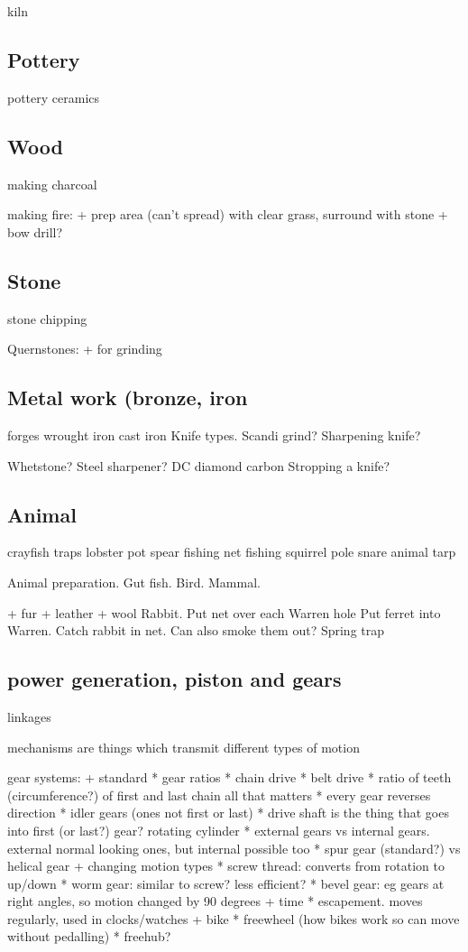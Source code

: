 kiln
\subsection{Pottery}
pottery
ceramics
\subsection{Wood}
making charcoal

making fire:
+ prep area (can't spread) with clear grass, surround with stone
+ bow drill?
\subsection{Stone}
stone chipping

Quernstones:
+ for grinding
\subsection{Metal work (bronze, iron}
forges
wrought iron
cast iron
Knife types. Scandi grind? Sharpening knife?

Whetstone? Steel sharpener? DC diamond carbon
Stropping a knife?

\subsection{Animal}
crayfish traps
lobster pot
spear fishing
net fishing
squirrel pole snare
animal tarp

Animal preparation. Gut fish. Bird. Mammal.

+ fur
+ leather
+ wool
Rabbit. Put net over each Warren hole
Put ferret into Warren. Catch rabbit in net.
Can also smoke them out?
Spring trap

\subsection{power generation, piston and gears}
linkages

mechanisms are things which transmit different types of motion

gear systems:
+ standard
  * gear ratios
  * chain drive
  * belt drive
  * ratio of teeth (circumference?) of first and last chain all that matters
  * every gear reverses direction
  * idler gears (ones not first or last)
  * drive shaft is the thing that goes into first (or last?) gear? rotating cylinder
  * external gears vs internal gears. external normal looking ones, but internal possible too
  * spur gear (standard?) vs helical gear
+ changing motion types
  * screw thread: converts from rotation to up/down
  * worm gear: similar to screw? less efficient?
  * bevel gear: eg gears at right angles, so motion changed by 90 degrees
+ time
  * escapement. moves regularly, used in clocks/watches
+ bike
  * freewheel (how bikes work so can move without pedalling)
  * freehub?

